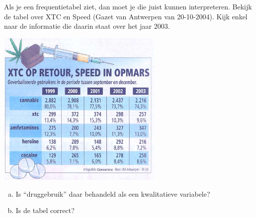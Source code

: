 \documentclass[12pt,twoside]{article}
\begin{document}
\begin{oefening}
Als je een frequentietabel ziet, dan moet je die juist kunnen interpreteren. Bekijk de tabel over XTC en Speed (Gazet van Antwerpen van 20-10-2004). Kijk enkel naar de informatie die daarin staat over het jaar 2003.

\begin{center}
\includegraphics[width=0.6\textwidth]{tabel-drugs}
\end{center}

\begin{enumerate}[(a)]
  \item Is “druggebruik” daar behandeld als een kwalitatieve variabele?
  \item Is de tabel correct?
\end{enumerate}
\end{oefening}
\end{document}

